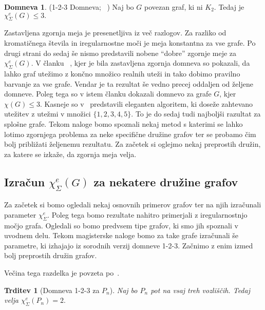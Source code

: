 \documentclass[12pt,a4paper,twoside]{article}
\theoremstyle{definition} %
\newtheorem{domneva}[definicija]{Domneva}
\theoremstyle{plain} %
\newtheorem{trditev}[definicija]{Trditev}
\newcommand{\ec}{\chi_{\Sigma}^e}
\numberwithin{equation}{section}  %
\begin{document}
\begin{domneva} 
	\label{123conjecture}
	(1-2-3 Domneva; ~\citet{base}) Naj bo $G$ povezan graf, ki ni $K_2$. Tedaj je $\ec(G) \le 3.$ 
\end{domneva}
Zastavljena zgornja meja je presenetljiva iz več razlogov. Za razliko od kromatičnega števila in iregularnostne moči je meja konstantna za vse grafe. Po drugi strani do sedaj še nismo predstavili nobene ``dobre'' zgornje meje za $\ec(G)$. V članku ~\cite{base}, kjer je bila zastavljena zgornja domneva so pokazali, da lahko graf utežimo z končno množico realnih uteži in tako dobimo pravilno barvanje za vse grafe. Vendar je ta rezultat še vedno precej oddaljen od željene domneve. Poleg tega so v istem članku dokazali domnevo za grafe $G$, kjer $\chi(G) \le 3$.
 Kasneje so v~\citet{proof12345} predstavili eleganten algoritem, ki doseže zahtevano utežitev z utežmi v množici $\{1,2,3,4,5\}$. To je do sedaj tudi najboljši razultat za splošne grafe. Tekom naloge bomo spoznali nekaj metod s katerimi se lahko lotimo zgornjega problema za neke specifične družine grafov ter se probamo čim bolj približati željenemu rezultatu. Za začetek si oglejmo nekaj preprostih družin, za katere se izkaže, da zgornja meja velja.

\subsection{Izračun $\ec(G)$ za nekatere družine grafov}

Za začetek si bomo ogledali nekaj osnovnih primerov grafov ter na njih izračunali parameter $\ec$. Poleg tega bomo rezultate nahitro primerjali z iregularnostnjo močjo grafa. Ogledali so bomo predvsem tipe grafov, ki smo jih spoznali v uvodnem delu. Tekom magisterske naloge bomo za take grafe izračunali še parametre, ki izhajajo iz sorodnih verzij domneve 1-2-3. Začnimo z enim izmed bolj preprostih družin grafov.

Večina tega razdelka je povzeta po~\cite{examples}.
\begin{trditev}[Domneva 1-2-3 za $P_n$]
Naj bo $P_n$ pot na vsaj treh vozliščih. Tedaj velja $\ec(P_n) = 2.$
\end{trditev}
\end{document}
